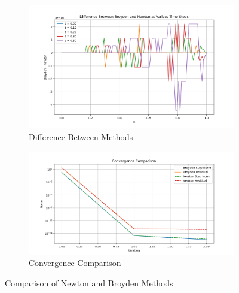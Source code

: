 \documentclass[12pt]{article}
\begin{document}
\begin{figure}[H]
  \begin{subfigure}[b]{0.6\textwidth}
    \includegraphics[width=\textwidth]{Dif_New_Broy.png}
    \caption{Difference Between Methods}
    \label{fig:difference}
  \end{subfigure}
  \hfill
  \begin{subfigure}[b]{0.6\textwidth}
    \includegraphics[width=\textwidth]{Convergence_comparison.png}
    \caption{Convergence Comparison}
    \label{fig:convergence}
  \end{subfigure}

  \caption{Comparison of Newton and Broyden Methods}
  \label{fig:four_panel}
\end{figure}
\end{document}
